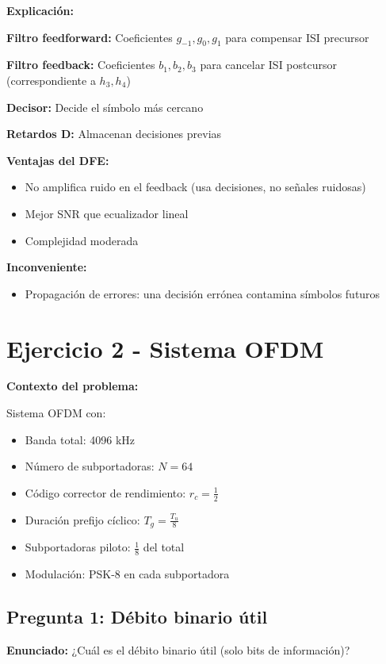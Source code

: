 \documentclass[11pt,a4paper]{article}
\begin{document}
\textbf{Explicaci\'on:}

\textbf{Filtro feedforward:} Coeficientes $g_{-1}, g_0, g_1$ para compensar ISI precursor

\textbf{Filtro feedback:} Coeficientes $b_1, b_2, b_3$ para cancelar ISI postcursor (correspondiente a $h_3, h_4$)

\textbf{Decisor:} Decide el s\'imbolo m\'as cercano

\textbf{Retardos D:} Almacenan decisiones previas

\textbf{Ventajas del DFE:}
\begin{itemize}
    \item No amplifica ruido en el feedback (usa decisiones, no se\~nales ruidosas)
    \item Mejor SNR que ecualizador lineal
    \item Complejidad moderada
\end{itemize}

\textbf{Inconveniente:}
\begin{itemize}
    \item Propagaci\'on de errores: una decisi\'on err\'onea contamina s\'imbolos futuros
\end{itemize}

\section*{Ejercicio 2 - Sistema OFDM}

\textbf{Contexto del problema:}

Sistema OFDM con:
\begin{itemize}
    \item Banda total: 4096 kHz
    \item N\'umero de subportadoras: $N = 64$
    \item C\'odigo corrector de rendimiento: $r_c = \frac{1}{2}$
    \item Duraci\'on prefijo c\'iclico: $T_g = \frac{T_u}{8}$
    \item Subportadoras piloto: $\frac{1}{8}$ del total
    \item Modulaci\'on: PSK-8 en cada subportadora
\end{itemize}

\subsection*{Pregunta 1: D\'ebito binario \'util}

\textbf{Enunciado:} ¿Cu\'al es el d\'ebito binario \'util (solo bits de informaci\'on)?
\end{document}
